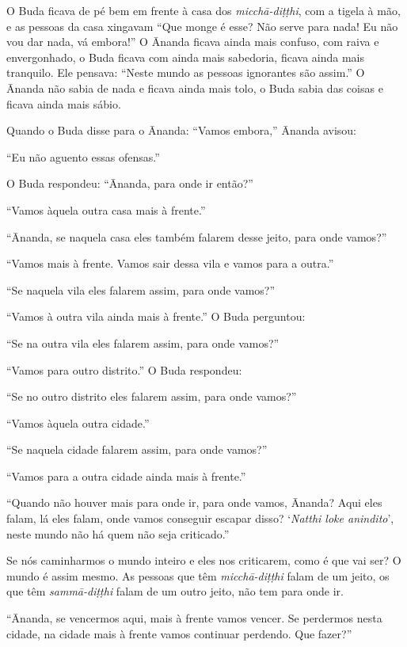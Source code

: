 O Buda ficava de pé bem em frente à casa dos
\emph{micchā-diṭṭhi}, com a tigela à mão, e as pessoas da casa
xingavam “Que monge é esse? Não serve para nada! Eu não vou dar nada,
vá embora!” O Ānanda ficava ainda mais confuso, com raiva e
envergonhado, o Buda ficava com ainda mais sabedoria, ficava ainda mais
tranquilo. Ele pensava: “Neste mundo as pessoas ignorantes são assim.”
O Ānanda não sabia de nada e ficava ainda mais tolo, o Buda sabia das
coisas e ficava ainda mais sábio. 

Quando o Buda disse para o Ānanda: “Vamos embora,” Ānanda
avisou: 

“Eu não aguento essas ofensas.” 

O Buda respondeu: “Ānanda, para onde ir então?”

“Vamos àquela outra casa mais à frente.”

“Ānanda, se naquela casa eles também falarem desse jeito, para
onde vamos?”

“Vamos mais à frente. Vamos sair dessa vila e vamos para a outra.”

“Se naquela vila eles falarem assim, para onde vamos?”

“Vamos à outra vila ainda mais à frente.” O Buda perguntou:

“Se na outra vila eles falarem assim, para onde vamos?”

“Vamos para outro distrito.” O Buda respondeu: 

“Se no outro distrito eles falarem assim, para onde vamos?”

“Vamos àquela outra cidade.”

“Se naquela cidade falarem assim, para onde vamos?”

“Vamos para a outra cidade ainda mais à frente.”

“Quando não houver mais para onde ir, para onde vamos, Ānanda?
Aqui eles falam, lá eles falam, onde vamos conseguir escapar disso?
‘\emph{Natthi loke anindito}’, neste mundo não há quem não
seja criticado.” 

Se nós caminharmos o mundo inteiro e eles nos criticarem, como é que
vai ser? O mundo é assim mesmo. As pessoas que têm
\emph{micchā-diṭṭhi} falam de um jeito, os que têm
\emph{sammā-diṭṭhi} falam de um outro jeito, não tem para onde ir. 

“Ānanda, se vencermos aqui, mais à frente vamos vencer. Se
perdermos nesta cidade, na cidade mais à frente vamos continuar
perdendo. Que fazer?”

